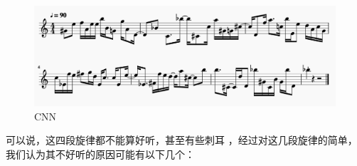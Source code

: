 \documentclass[UTF8,a4paper,10pt]{ctexart}
\begin{document}
    \begin{figure}[H]
    \begin{center}
        \includegraphics[width=1.0\columnwidth]{output_cnn_melody.png}
        \caption{CNN}
    \end{center}
    \end{figure}

    可以说，这四段旋律都不能算好听，甚至有些刺耳 ，经过对这几段旋律的简单，我们认为其不好听的原因可能有以下几个：
\end{document}
